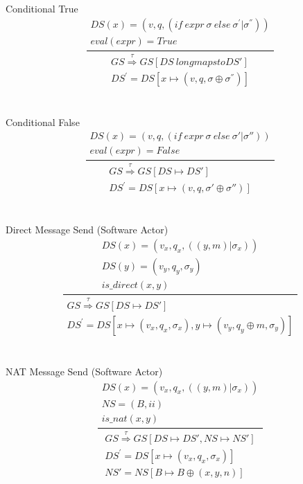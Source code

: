 \documentclass[]{article}
\begin{document}
\\\\
Conditional True
\begin{equation}
\frac
{
	\begin{gathered}
	DS(x)=(v,q,(if \ expr \ \sigma \ else \ \sigma ^{'} |\sigma ^{''})) \\
	eval(expr) = True
	\end{gathered}
}
{
	\begin{gathered}
	GS\overset{\tau}{\Rightarrow}GS[DS\ longmapsto DS'] \\
	 DS^{'}=DS[x \longmapsto(v,q,\sigma \oplus \sigma ^{''})]
	\end{gathered}
}
\end{equation}
\\\\
Conditional False
\begin{equation}\label{ConditionalFalse}
\frac
{
	\begin{gathered}
	DS(x)=(v,q,(if \ expr \ \sigma \ else \ \sigma ' |\sigma'')) \\
	eval(expr) = False
	\end{gathered}
}
{
	\begin{gathered}
	GS\overset{\tau}{\Rightarrow}GS[DS \longmapsto DS'] \\
	DS^{'}=DS[x \longmapsto(v,q,\sigma' \oplus \sigma'')]
	\end{gathered}
}
\end{equation}
\\\\
Direct Message Send (Software Actor)
\begin{equation}
\frac
{
	\begin{gathered}
	DS(x)=(v_x,q_x,((y,m) |\sigma_x)) \\
	DS(y) = (v_y,q_y,\sigma_y) \\
	is\_direct(x,y)
	\end{gathered}
}
{
	\begin{gathered}
	GS\overset{\tau}{\Rightarrow}GS[DS\longmapsto DS'] \\
	DS^{'}=DS[x \longmapsto(v_x,q_x,\sigma_x),y\longmapsto(v_y,q_y \oplus m,\sigma_y) ]
	\end{gathered}
}
\end{equation}
\\\\
NAT Message Send (Software Actor)
\begin{equation}
\frac
{
	\begin{gathered}
	DS(x)=(v_x,q_x,((y,m) |\sigma_x)) \\
	NS = (B,ii) \\
	is\_nat(x,y)
	\end{gathered}
}
{
	\begin{gathered}
	GS\overset{\tau}{\Rightarrow}GS[DS\longmapsto DS', NS\longmapsto NS'] \\
	DS^{'}=DS[x \longmapsto(v_x,q_x,\sigma_x)]\\
	NS' = NS[B\longmapsto B \oplus (x,y,n)]
	\end{gathered}
}
\end{equation}
\end{document}
